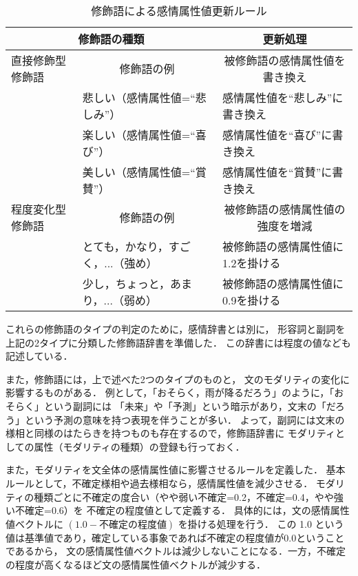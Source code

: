 \documentclass[japanese]{jnlp_1.3c}
\begin{document}
\begin{table}[b]
\begin{center}
\caption{修飾語による感情属性値更新ルール}
\begin{tabular}{|l|l|l|}
\hline 
\multicolumn{2}{|c|}{修飾語の種類} & \multicolumn{1}{|c|}{更新処理}				\\ \hline \hline
直接修飾型修飾語 & \multicolumn{1}{|c|}{修飾語の例}	 & \multicolumn{1}{|c|}{被修飾語の感情属性値を書き換え}       \\ \cline{2-3}
	& 悲しい（感情属性値=“悲しみ”） & 感情属性値を“悲しみ”に書き換え \\ \cline{2-3}
        & 楽しい（感情属性値=“喜び”） & 感情属性値を“喜び”に書き換え \\ \cline{2-3}
        & 美しい（感情属性値=“賞賛”） & 感情属性値を“賞賛”に書き換え \\ \hline \hline
程度変化型修飾語	& \multicolumn{1}{|c|}{修飾語の例}	  & \multicolumn{1}{|c|}{被修飾語の感情属性値の強度を増減}	 \\ \cline{2-3}
	& とても，かなり，すごく，...（強め）	& 被修飾語の感情属性値に1.2を掛ける \\  \cline{2-3}
	& 少し，ちょっと，あまり，...（弱め）	& 被修飾語の感情属性値に0.9を掛ける \\ \hline
\end{tabular}
\label{tb:shushoku}
\end{center}
\end{table}

これらの修飾語のタイプの判定のために，感情辞書とは別に，
形容詞と副詞を上記の2タイプに分類した修飾語辞書を準備した．
この辞書には程度の値なども記述している．

また，修飾語には，上で述べた2つのタイプのものと，
文のモダリティの変化に影響するものがある．
例として，「おそらく，雨が降るだろう」のように，「おそらく」という副詞には
「未来」や「予測」という暗示があり，文末の「だろう」という予測の意味を持つ表現を伴うことが多い．
よって，副詞には文末の様相と同様のはたらきを持つものも存在するので，修飾語辞書に
モダリティとしての属性（モダリティの種類）の登録も行っておく．

また，モダリティを文全体の感情属性値に影響させるルールを定義した．
基本ルールとして，不確定様相や過去様相なら，感情属性値を減少させる．
モダリティの種類ごとに不確定の度合い（やや弱い不確定=0.2，不確定=0.4，やや強い不確定=0.6）を
不確定の程度値として定義する．
具体的には，文の感情属性値ベクトルに $(1.0 - 不確定の程度値)$ を掛ける処理を行う．
この 1.0 という値は基準値であり，確定している事象であれば不確定の程度値が0.0ということであるから，
文の感情属性値ベクトルは減少しないことになる．一方，不確定の程度が高くなるほど文の感情属性値ベクトルが減少する．
\end{document}
